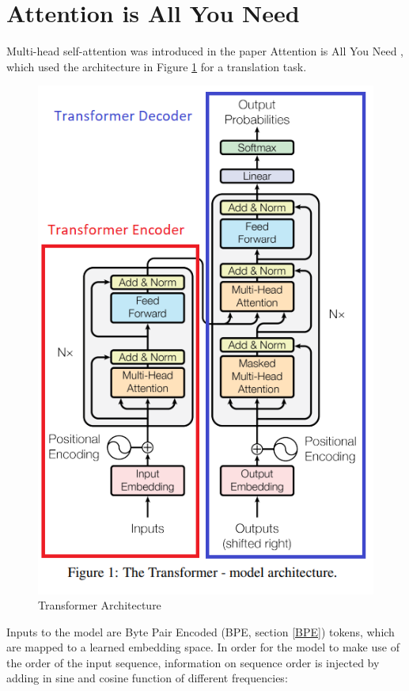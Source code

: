 \documentclass[11pt]{article}
\theoremstyle{definition}
\begin{document}
\section{Attention is All You Need \cite{vaswani2017attention}}

Multi-head self-attention was introduced in the paper Attention is All You Need \cite{vaswani2017attention}, which used the architecture in Figure \ref{fig:fulltransformer} for a translation task.

\begin{figure}
\centering
  \includegraphics{transformers/transformer_architecture.png}
  \caption{Transformer Architecture \cite{vaswani2017attention}}
  \label{fig:fulltransformer}
\end{figure}

Inputs to the model are Byte Pair Encoded (BPE, section \ref{BPE}) tokens, which are mapped to a learned embedding space. In order for the model to make use of the order of the input sequence, information on sequence order is injected by adding in sine and cosine function of different frequencies:
\end{document}
